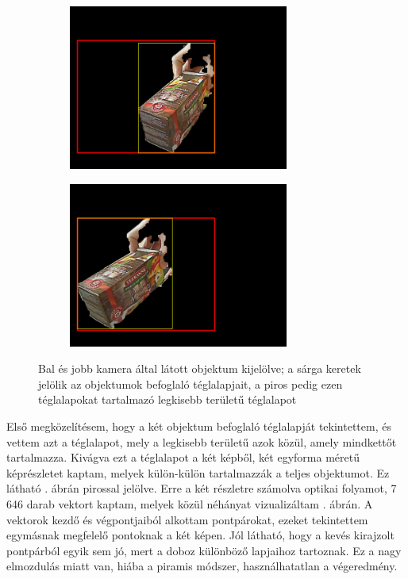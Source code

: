\begin{figure}[tbh]
\centering
\begin{subfigure}[b]{.49\linewidth}
	\centering
	\includegraphics[width=205pt]{figures/of_img_left_framed.png}
  \end{subfigure}
\begin{subfigure}[b]{.49\linewidth}
	\centering
	\includegraphics[width=205pt]{figures/of_img_right_framed.png}
  \end{subfigure}
\caption{Bal és jobb kamera által látott objektum kijelölve; a sárga keretek jelölik az objektumok befoglaló téglalapjait, a piros pedig ezen téglalapokat tartalmazó legkisebb területű téglalapot \label{fig:of_original}}
\end{figure}

Első megközelítésem, hogy a két objektum befoglaló téglalapját tekintettem, és vettem azt a téglalapot, mely a legkisebb területű azok közül, amely mindkettőt tartalmazza. Kivágva ezt a téglalapot a két képből, két egyforma méretű képrészletet kaptam, melyek külön-külön tartalmazzák a teljes objektumot. Ez látható . ábrán pirossal jelölve. Erre a két részletre számolva optikai folyamot, 7 646 darab vektort kaptam, melyek közül néhányat vizualizáltam . ábrán. A vektorok kezdő és végpontjaiból alkottam pontpárokat, ezeket tekintettem egymásnak megfelelő pontoknak a két képen. Jól látható, hogy a kevés kirajzolt pontpárból egyik sem jó, mert a doboz különböző lapjaihoz tartoznak. Ez a nagy elmozdulás miatt van, hiába a piramis módszer, használhatatlan a végeredmény.

